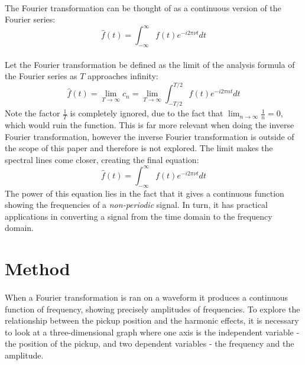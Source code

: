 \documentclass{article}
\begin{document}
\paragraph*{}
The Fourier transformation can be thought of as a continuous version of the 
Fourier series:
$$\hat{f} (t) = \int^{\infty}_{-\infty} f(t) e^{-i 2 \pi \nu t} dt$$

\paragraph*{}
Let the Fourier transformation be defined as the limit of the analysis 
formula of the Fourier series as $T$ approaches infinity:
$$\hat{f} (t) = \lim_{T \rightarrow \infty} c_n = \lim_{T \rightarrow \infty} 
\int_{-T / 2}^{T / 2} f(t) e^{-i 2 \pi n t} dt$$
Note the factor $\frac{1}{T}$ is completely ignored, due to the fact that 
$\lim_{n \rightarrow \infty} \frac{1}{n} = 0$, which would ruin the function. 
This is far more relevant when doing the inverse Fourier transformation, 
however the inverse Fourier transformation is outside of the scope of this 
paper and therefore is not explored. The limit makes the spectral lines come 
closer, creating the final equation:
$$\hat{f} (t) = \int_{-\infty}^{\infty} f(t) e^{-i 2 \pi \nu t} dt$$
The power of this equation lies in the fact that it gives a continuous 
function showing the frequencies of a \textit{non-periodic} signal. In turn, 
it has practical applications in converting a signal from the time domain to 
the frequency domain.

\section{Method}

\paragraph*{}
When a Fourier transformation is ran on a waveform it produces a continuous 
function of frequency, showing precisely amplitudes of frequencies. To explore 
the relationship between the pickup position and the harmonic effects, it is 
necessary to look at a three-dimensional graph where one axis is the 
independent variable - the position of the pickup, and two dependent 
variables - the frequency and the amplitude.
\end{document}

